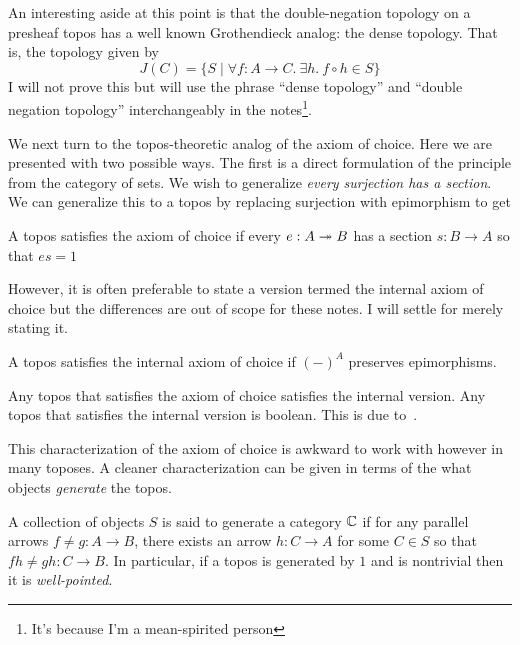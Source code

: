 An interesting aside at this point is that the double-negation
topology on a presheaf topos has a well known Grothendieck analog: the
dense topology. That is, the topology given by
\[
  J(C) = \{ S \mid \forall f : A \to C.\ \exists h.\ f \circ h \in S\}
\]
I will not prove this but will use the phrase ``dense topology'' and
``double negation topology'' interchangeably in the
notes\footnote{It's because I'm a mean-spirited person}.

We next turn to the topos-theoretic analog of the axiom of
choice. Here we are presented with two possible ways. The first is a
direct formulation of the principle from the category of sets. We wish
to generalize \emph{every surjection has a section}. We can generalize
this to a topos by replacing surjection with epimorphism to get

\begin{defn}\label{defn:background:aoc}
  A topos satisfies the axiom of choice if every $e : A \twoheadrightarrow B$ has a
  section $s : B \to A$ so that $es = 1$
\end{defn}

However, it is often preferable to state a version termed the internal
axiom of choice but the differences are out of scope for these
notes. I will settle for merely stating it.

\begin{defn}\label{defn:background:iaoc}
  A topos satisfies the internal axiom of choice if $(-)^A$ preserves
  epimorphisms.
\end{defn}

\begin{remark}
  Any topos that satisfies the axiom of choice satisfies the internal
  version. Any topos that satisfies the internal version is
  boolean. This is due to~\citet{Diaconescu:75}.
\end{remark}

This characterization of the axiom of choice is awkward to work with
however in many toposes. A cleaner characterization can be given in
terms of the what objects \emph{generate} the topos.

\begin{defn}\label{defn:background:generate}
  A collection of objects $S$ is said to generate a category $\mathbb{C}$
  if for any parallel arrows $f \neq g : A \to B$, there exists an
  arrow $h : C \to A$ for some $C \in S$ so that
  $fh \neq gh : C \to B$. In particular, if a topos is generated by
  $1$ and is nontrivial then it is \emph{well-pointed}.
\end{defn}


